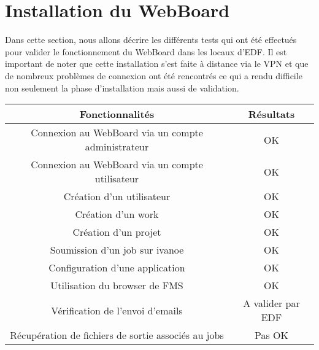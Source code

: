 \documentclass{article}
\begin{document}
\section{Installation du WebBoard}

Dans cette section, nous allons décrire les différents tests qui ont été effectués pour valider le fonctionnement du WebBoard dans 
les locaux d'EDF. Il est important de noter que cette installation s'est faite à distance via le VPN et que de nombreux problèmes de 
connexion ont été rencontrés ce qui a rendu difficile non seulement la phase d'installation mais aussi de validation.

\begin{tabular}{|c|c|}
\hline 
Fonctionnalités & Résultats \\
\hline 
Connexion au WebBoard via un compte administrateur & OK \\
\hline
Connexion au WebBoard via un compte utilisateur & OK \\
\hline
Création d'un utilisateur & OK \\
\hline
Création d'un work & OK \\
\hline
Création d'un projet & OK \\
\hline
Soumission d'un job sur ivanoe & OK \\
\hline
Configuration d'une application & OK \\
\hline
Utilisation du browser de FMS & OK \\
\hline
Vérification de l'envoi d'emails & A valider par EDF \\
\hline
Récupération de fichiers de sortie associés au jobs & Pas OK \\
\hline
\end{tabular}


%
%
    
\end{document}
